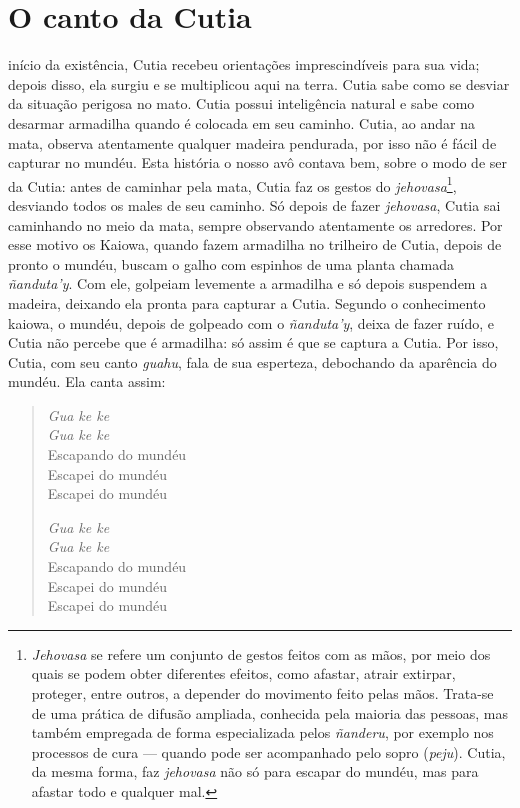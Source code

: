 \chapter{O canto da Cutia}

 início da existência, Cutia recebeu orientações imprescindíveis para
sua vida; depois disso, ela surgiu e se multiplicou aqui na terra. Cutia
sabe como se desviar da situação perigosa no mato. Cutia possui
inteligência natural e sabe como desarmar armadilha quando é colocada em
seu caminho. Cutia, ao andar na mata, observa atentamente qualquer
madeira pendurada, por isso não é fácil de capturar no mundéu. Esta
história o nosso avô contava bem, sobre o modo de ser da Cutia: antes de
caminhar pela mata, Cutia faz os gestos do \textit{jehovasa}\footnote{\textit{Jehovasa}
  se refere um conjunto de gestos feitos com as mãos, por meio dos quais
  se podem obter diferentes efeitos, como afastar, atrair extirpar,
  proteger, entre outros, a depender do movimento feito pelas mãos.
  Trata-se de uma prática de difusão ampliada, conhecida pela maioria
  das pessoas, mas também empregada de forma especializada pelos
  \textit{ñanderu}, por exemplo nos processos de cura --- quando pode ser
  acompanhado pelo sopro (\textit{peju}). Cutia, da mesma forma, faz
  \textit{jehovasa} não só para escapar do mundéu, mas para afastar todo e
  qualquer mal.}, desviando todos os males de seu caminho. Só depois de
fazer \textit{jehovasa}, Cutia sai caminhando no meio da mata, sempre
observando atentamente os arredores. Por esse motivo os Kaiowa, quando
fazem armadilha no trilheiro de Cutia, depois de pronto o mundéu, buscam
o galho com espinhos de uma planta chamada \textit{ñanduta'y}. Com ele,
golpeiam levemente a armadilha e só depois suspendem a madeira, deixando
ela pronta para capturar a Cutia. Segundo o conhecimento kaiowa, o
mundéu, depois de golpeado com o \textit{ñanduta'y}, deixa de fazer ruído,
e Cutia não percebe que é armadilha: só assim é que se captura a Cutia.
Por isso, Cutia, com seu canto \textit{guahu}, fala de sua esperteza,
debochando da aparência do mundéu. Ela canta assim:

\begin{verse}
\textit{Gua ke ke}\\
\textit{Gua ke ke}\\
Escapando do mundéu\\
Escapei do mundéu\\
Escapei do mundéu

\textit{Gua ke ke}\\
\textit{Gua ke ke}\\
Escapando do mundéu\\
Escapei do mundéu\\
Escapei do mundéu  
\end{verse}

